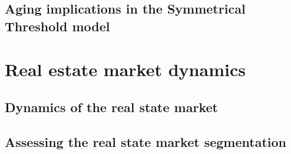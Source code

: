 \documentclass[
	11pt, %
	a4paper,
]{LegrandOrangeBook}
\begin{document}
\chapter{Aging implications in the Symmetrical Threshold model}



\part{Real estate market dynamics}
\chapterspaceabove{6.75cm}
\chapterspacebelow{7.25cm}

\chapter{Dynamics of the real state market}


\chapterspaceabove{6.75cm}
\chapterspacebelow{7.25cm}

\chapter{Assessing the real state market segmentation}


\stopcontents[part] %


\chapterimage{} %
\chapterspaceabove{2.5cm} %
\chapterspacebelow{2cm} %
\end{document}

